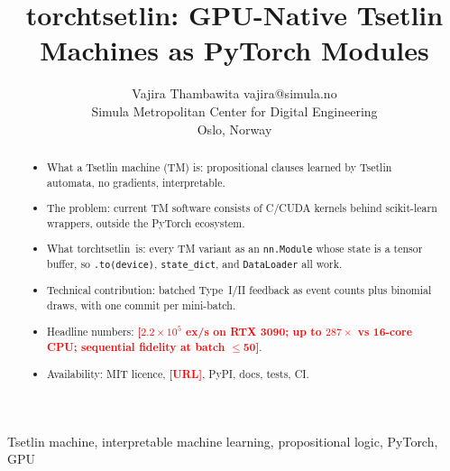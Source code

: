\documentclass[twoside,11pt]{article}
\newcommand{\ph}[1]{\textcolor{red}{\textbf{[#1]}}}
\newenvironment{plan}{\begin{itemize}\color{gray}\small}{\end{itemize}}
\newcommand{\budget}[1]{\marginpar{\tiny\color{blue}#1}}
\newcommand{\code}[1]{\texttt{#1}}
\newcommand{\lib}{\textsf{torchtsetlin}}
\begin{document}
\title{torchtsetlin: GPU-Native Tsetlin Machines as PyTorch Modules}

\author{\name Vajira Thambawita \email vajira@simula.no \\
       \addr Simula Metropolitan Center for Digital Engineering\\
       Oslo, Norway
       }


\maketitle

\begin{abstract}%
\budget{$\le$200 words}
\begin{plan}
  \item What a Tsetlin machine (TM) is: propositional clauses learned by Tsetlin automata, no gradients, interpretable.
  \item The problem: current TM software consists of C/CUDA kernels behind scikit-learn wrappers, outside the PyTorch ecosystem.
  \item What \lib\ is: every TM variant as an \code{nn.Module} whose state is a tensor buffer, so \code{.to(device)}, \code{state\_dict}, and \code{DataLoader} all work.
  \item Technical contribution: batched Type~I/II feedback as event counts plus binomial draws, with one commit per mini-batch.
  \item Headline numbers: \ph{$2.2\times10^5$ ex/s on RTX 3090; up to $287\times$ vs 16-core CPU; sequential fidelity at batch $\le$50}.
  \item Availability: MIT licence, \ph{URL}, PyPI, docs, tests, CI.
\end{plan}
\end{abstract}

\begin{keywords}
  Tsetlin machine, interpretable machine learning, propositional logic, PyTorch, GPU
\end{keywords}

\end{document}
